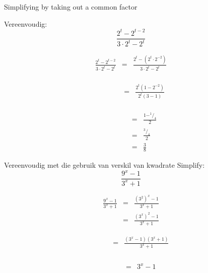 
\begin{wex}
{%
Simplifying by taking out a common factor
}
{%
Vereenvoudig: $$\frac{2^t-2^{t-2}}{3\cdot2^t-2^t} $$

}
{%
\begin{eqnarray*}
\frac{2^t-2^{t-2}}{3\cdot2^t-2^t} & = & \frac{2^t-(2^t\cdot2^{-2})}{3\cdot2^t-2^t} \\
\end{eqnarray*}


\begin{eqnarray*}
\phantom{\frac{2^t-2^{t-2}}{3\cdot2^t-2^t}}  & = & \frac{2^t(1-2^{-2})}{2^t(3-1)} \\
\end{eqnarray*}



\begin{eqnarray*}
\phantom{\frac{2^t-2^{t-2}}{3\cdot2^t-2^t}}  & = & \frac{1-^1/_4}{2} \\
					     & = & \frac{^3/_4}{2} \\
					     & = & \frac{3}{8}
\end{eqnarray*}


} 
\end{wex}




\begin{wex}
{
Vereenvoudig met die gebruik van verskil van kwadrate
}
{
Simplify: 
$$ \frac{9^x-1}{3^x+1} $$
}
{
\begin{eqnarray*}
 \frac{9^x-1}{3^x+1} & = & \frac{(3^2)^x -1}{3^x+1} \\
		     & = & \frac{(3^x)^2-1}{3^x+1} 
\end{eqnarray*}


\begin{eqnarray*}
 \phantom{\frac{9^x-1}{3^x+1}} & = & \frac{(3^x-1)(3^x+1)}{3^x+1}\\
\end{eqnarray*}


\begin{eqnarray*}
 \phantom{\frac{9^x-1}{3^x+1}} & = & 3^x-1\\
\end{eqnarray*}

}
\end{wex}


